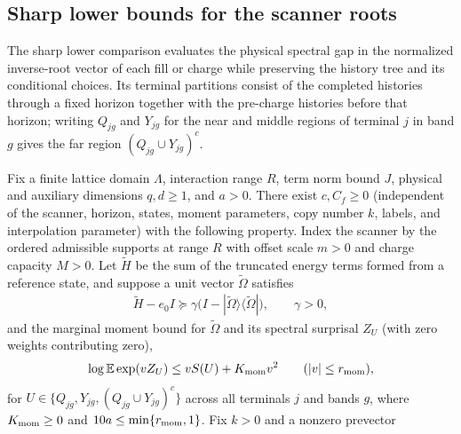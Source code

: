 \subsection{Sharp lower bounds for the scanner roots}

The sharp lower comparison evaluates the physical spectral gap in the
normalized inverse-root vector of each fill or charge while preserving
the history tree and its conditional choices.
Its terminal partitions consist of the completed histories through a
fixed horizon together with the pre-charge histories before that horizon;
writing $Q_{jg}$ and $Y_{jg}$ for the near and middle regions of terminal
$j$ in band $g$ gives the far region $(Q_{jg}\cup Y_{jg})^c$.

\begin{lemma}
    \label{thm:actual_scan_sharp_lower_norm}
    \leanok
    Fix a finite lattice domain $\Lambda$, interaction range $R$, term
    norm bound $J$, physical and auxiliary dimensions $q,d\ge1$,
    and $a>0$. There exist $c,C_f\geq0$ (independent of the scanner,
    horizon, states, moment parameters, copy number $k$, labels, and
    interpolation parameter) with the following property.
    Index the scanner by the ordered admissible supports at range $R$
    with offset scale $m>0$ and charge capacity $M>0$. Let $\widetilde H$
    be the sum of the truncated energy terms formed from a reference
    state, and suppose a unit vector $\widetilde\Omega$ satisfies
    \begin{align}
        \widetilde H-e_0 I
        \succeq \gamma
        \bigl(I-|\widetilde\Omega\rangle
        \langle\widetilde\Omega|\bigr),
        \qquad \gamma>0,
        \label{eq:actual_scan_sharp_lower_gap}
    \end{align}
    and the marginal moment bound for $\widetilde\Omega$ and its spectral
    surprisal $Z_U$ (with zero weights contributing zero),
    \begin{align}
        \log\mathbb E\exp(vZ_U)
        \leq vS(U)+K_{\rm mom}v^2
        \qquad (|v|\leq r_{\rm mom}),
        \label{eq:actual_scan_sharp_lower_moment}
    \end{align}
    for $U\in\{Q_{jg},Y_{jg},(Q_{jg}\cup Y_{jg})^c\}$ across all terminals
    $j$ and bands $g$, where $K_{\rm mom}\geq0$ and
    $10a\leq\min\{r_{\rm mom},1\}$. Fix $k>0$ and a nonzero prevector

\end{lemma}
